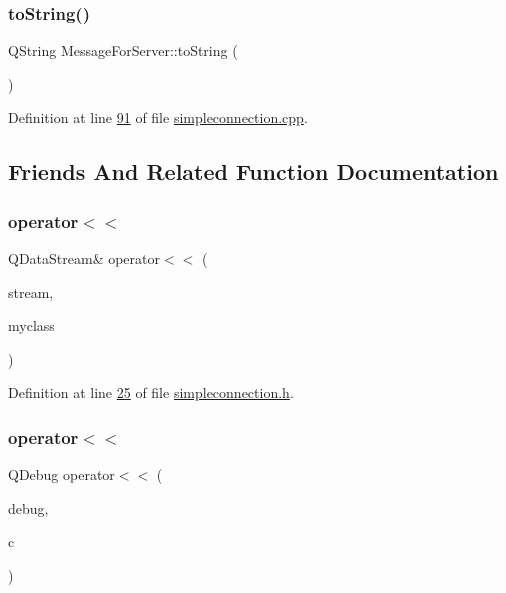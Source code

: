 \subsubsection{\texorpdfstring{to\+String()}{toString()}}
{\footnotesize\ttfamily Q\+String Message\+For\+Server\+::to\+String (\begin{DoxyParamCaption}{ }\end{DoxyParamCaption})}



Definition at line \hyperlink{a00005_source_l00091}{91} of file \hyperlink{a00005_source}{simpleconnection.\+cpp}.



\subsection{Friends And Related Function Documentation}
\mbox{\label{a00121_a0562e6e482b8c98c43d4351d63fe9a97}} 
\subsubsection{\texorpdfstring{operator$<$$<$}{operator<<}\hspace{0.1cm}{\footnotesize\ttfamily [1/2]}}
{\footnotesize\ttfamily Q\+Data\+Stream\& operator$<$$<$ (\begin{DoxyParamCaption}\item[{Q\+Data\+Stream \&}]{stream,  }\item[{const \hyperlink{a00121}{Message\+For\+Server} \&}]{myclass }\end{DoxyParamCaption})\hspace{0.3cm}{\ttfamily [friend]}}



Definition at line \hyperlink{a00008_source_l00025}{25} of file \hyperlink{a00008_source}{simpleconnection.\+h}.

\mbox{\label{a00121_ab72134ee0c57b530f11fe2f24c205979}} 
\subsubsection{\texorpdfstring{operator$<$$<$}{operator<<}\hspace{0.1cm}{\footnotesize\ttfamily [2/2]}}
{\footnotesize\ttfamily Q\+Debug operator$<$$<$ (\begin{DoxyParamCaption}\item[{Q\+Debug}]{debug,  }\item[{\hyperlink{a00121}{Message\+For\+Server} \&}]{c }\end{DoxyParamCaption})\hspace{0.3cm}{\ttfamily [friend]}}



